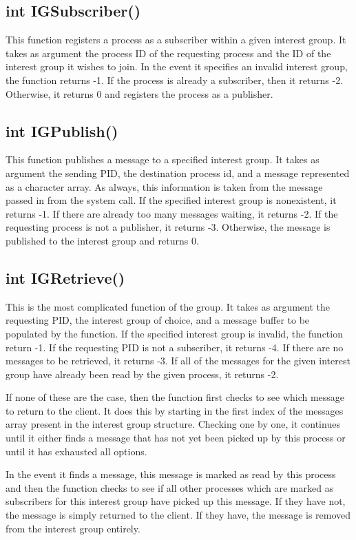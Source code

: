 \documentclass{article}
\begin{document}
\subsection{int IGSubscriber()}
This function registers a process as a subscriber within a given interest group.  It takes as argument the process ID of the requesting process and the ID of the interest group it wishes to join.  In the event it specifies an invalid interest group, the function returns -1.  If the process is already a subscriber, then it returns -2.  Otherwise, it returns 0 and registers the process as a publisher.

\subsection{int IGPublish()}
This function publishes a message to a specified interest group.  It takes as argument the sending PID, the destination process id, and a message represented as a character array.  As always, this information is taken from the message passed in from the system call.  If the specified interest group is nonexistent, it returns -1.  If there are already too many messages waiting, it returns -2.  If the requesting process is not a publisher, it returns -3.  Otherwise, the message is published to the interest group and returns 0.

\subsection{int IGRetrieve()}
This is the most complicated function of the group.  It takes as argument the requesting PID, the interest group of choice, and a message buffer to be populated by the function.  If the specified interest group is invalid, the function return -1.  If the requesting PID is not a subscriber, it returns -4.  If there are no messages to be retrieved, it returns -3.  If all of the messages for the given interest group have already been read by the given process, it returns -2.

If none of these are the case, then the function first checks to see which message to return to the client.  It does this by starting in the first index of the messages array present in the interest group structure.  Checking one by one, it continues until it either finds a message that has not yet been picked up by this process or until it has exhausted all options.

In the event it finds a message, this message is marked as read by this process and then the function checks to see if all other processes which are marked as subscribers for this interest group have picked up this message.  If they have not, the message is simply returned to the client.  If they have, the message is removed from the interest group entirely.
\end{document}
